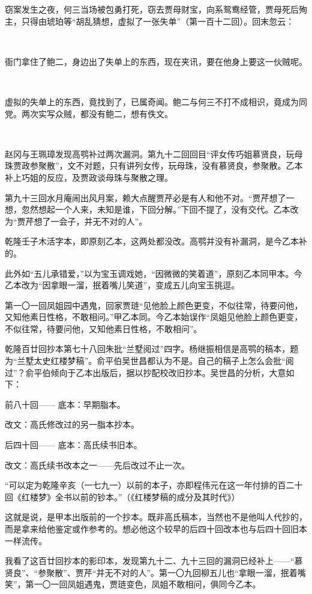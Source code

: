 \par 窃案发生之夜，何三当场被包勇打死，窃去贾母财宝，向系鸳鸯经管，贾母死后殉主，只得由琥珀等“胡乱猜想，虚拟了一张失单”（第一百十二回）。回末忽云：
\par  
\par 衙门拿住了鲍二，身边出了失单上的东西，现在夹讯，要在他身上要这一伙贼呢。
\par  
\par 虚拟的失单上的东西，竟找到了，已属奇闻。鲍二与何三不打不成相识，竟成为同党。两次实写众贼，都没有鲍二，想有佚文。
\par  
\par 赵冈与王珮璋发现高鹗补过两次漏洞。第九十二回回目“评女传巧姐慕贤良，玩母珠贾政参聚散”，文不对题，只有讲列女传，玩母珠，没有慕贤良，参聚散。乙本补上巧姐的反应，及贾政谈母珠与聚散之理。
\par 第九十三回水月庵闹出风月案，赖大点醒贾芹必是有人和他不对。“贾芹想了一想，忽然想起一个人来，未知是谁，下回分解。”下回不提了，没有交代。乙本改为“贾芹想了一会子，并无不对的人”。
\par 乾隆壬子木活字本，即原刻乙本，这两处都没改。高鹗并没有补漏洞，是今乙本补的。
\par 此外如“五儿承错爱，”以为宝玉调戏她，“因微微的笑着道”，原刻乙本同甲本。今乙本改为“因拿眼一溜，抿着嘴儿笑道”，变成五儿向宝玉挑逗。
\par 第一〇一回凤姐园中遇鬼，回家贾琏“见他脸上颜色更变，不似往常，待要问他，又知他素日性格，不敢相问。”甲乙本同。今乙本始误作“凤姐见他脸上颜色更变，不似往常，待要问他，又知他素日性格，不敢相问”。
\par 乾隆百廿回抄本第七十八回朱批“兰墅阅过”四字。杨继振相信是高鹗的稿本，题为“兰墅太史红楼梦稿”。俞平伯吴世昌都认为不是。自己的稿子上怎么会批“阅过”？俞平伯倾向于乙本出版后，据以抄配校改旧抄本。吴世昌的分析，大意如下：
\par 前八十回—— 底本：早期脂本。
\par 改文：高氏修改过的另一脂本抄本。
\par 后四十回—— 底本：高氏续书旧本。
\par 改文：高氏续书改本之一——先后改过不止一次。
\par “可以定为乾隆辛亥（一七九一）以前的本子，亦即程伟元在这一年付排的百二十回《红楼梦》全书以前的钞本。”（《红楼梦稿的成分及其时代》）
\par 这就是说，是甲本出版前的一个抄本。既非高氏稿本，当然也不是他叫人代抄的，而是拿来给他鉴定或作参考的。想必他这个较早的后四十回改本也与后四十回旧本一样流传。
\par 我看了这百廿回抄本的影印本，发现第九十二、九十三回的漏洞已经补上——“慕贤良”、“参聚散”、贾芹“并无不对的人”。第一〇九回柳五儿也“拿眼一溜，抿着嘴笑”，第一〇一回凤姐遇鬼，贾琏变色，凤姐不敢相问，俱同今乙本。
